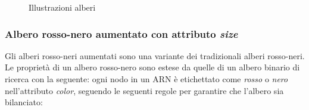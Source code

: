 \documentclass[onecolumn]{article}
\begin{document}
\begin{figure}
  \centering
    \qquad
    \caption{Illustrazioni alberi}
    \label{fig:alberi}
\end{figure}

\subsubsection{Albero rosso-nero aumentato con attributo \textit{size}}

Gli alberi rosso-neri aumentati sono una variante dei tradizionali alberi rosso-neri. Le proprietà di un albero rosso-nero sono estese da quelle di un albero binario di ricerca con la seguente: ogni nodo in un ARN è etichettato come \textit{rosso} o \textit{nero} nell'attributo \textit{color}, seguendo le seguenti regole per garantire che l'albero sia bilanciato:
\end{document}
